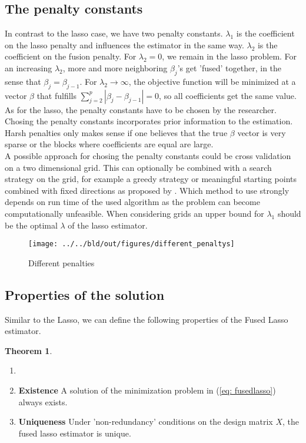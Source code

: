 \documentclass{article}
\theoremstyle{definition}
\newtheorem{theorem}{Theorem}
\begin{document}

\subsection{The penalty constants} \label{subsec: penalties}
In contrast to the lasso case, we have two penalty constants. $\lambda_1$ is the coefficient on the lasso penalty and influences the estimator in the same way. $\lambda_2$ is the coefficient on the fusion penalty.  For $\lambda_2=0$, we remain in the lasso problem. For an increasing $\lambda_2$, more and more neighboring $\beta_j$'s get 'fused' together, in the sense that $\beta_j=\beta_{j-1}$. For $\lambda_2\to\infty$, the objective function will be minimized at a vector $\beta$ that fulfills $\sum_{j=2}^p|\beta_j- \beta_{j-1}|=0$, so all coefficients get the same value.\\
As for the lasso, the penalty constants have to be chosen by the researcher.
Chosing the penalty constants incorporates prior information to the estimation. Harsh penalties only makes sense if one believes that the true $\beta$ vector is very sparse or the blocks where coefficients are equal are large. \\
A possible approach for chosing the penalty constants could be cross validation on a two dimensional grid. This can optionally be combined with a search strategy on the grid, for example a greedy strategy or meaningful starting points combined with fixed directions as proposed by \citep{fused}. Which method to use strongly depends on run time of the used algorithm as the problem can become computationally unfeasible. 
When considering grids an upper bound for $\lambda_1$ should be the optimal $\lambda$ of the lasso estimator.

\begin{figure}
	\texttt{[image: ../../bld/out/figures/different\_penaltys]}
	\caption{Different penalties}
\end{figure}

\subsection{Properties of the solution}

Similar to the Lasso, we can define the following properties of the Fused Lasso estimator.

\begin{theorem}
	\begin{enumerate}
		\item[]
		\item \textbf{Existence} A solution of the minimization problem in (\ref{eq: fusedlasso}) always exists.
		\item \textbf{Uniqueness} \citep{ali2018generalized} Under 'non-redundancy' conditions on the design matrix $X$, the fused lasso estimator is unique.
	\end{enumerate}
\end{theorem}
\end{document}
